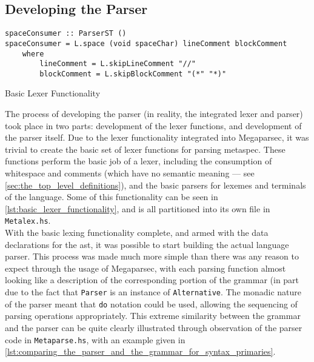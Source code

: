
\subsection{Developing the Parser} %
\label{sub:developing_the_parser}
\begin{listing}[!htb]
\begin{verbatim}
spaceConsumer :: ParserST ()
spaceConsumer = L.space (void spaceChar) lineComment blockComment
    where
        lineComment = L.skipLineComment "//"
        blockComment = L.skipBlockComment "(*" "*)"
\end{verbatim}
\caption{Basic Lexer Functionality}
\label{lst:basic_lexer_functionality}
\end{listing}

The process of developing the parser (in reality, the integrated lexer and parser) took place in two parts: development of the lexer functions, and development of the parser itself. 
Due to the lexer functionality integrated into Megaparsec, it was trivial to create the basic set of lexer functions for parsing \gls{metaspec}. 
These functions perform the basic job of a lexer, including the consumption of whitespace and comments (which have no semantic meaning --- see \autoref{sec:the_top_level_definitions}), and the basic parsers for lexemes and terminals of the language.
Some of this functionality can be seen in \autoref{lst:basic_lexer_functionality}, and is all partitioned into its own file in \texttt{Metalex.hs}.\\

With the basic lexing functionality complete, and armed with the data declarations for the \gls{ast}, it was possible to start building the actual language parser. 
This process was made much more simple than there was any reason to expect through the usage of Megaparsec, with each parsing function almost looking like a description of the corresponding portion of the grammar (in part due to the fact that \texttt{Parser} is an instance of \texttt{Alternative}. 
The monadic nature of the parser meant that \texttt{do} notation could be used, allowing the sequencing of parsing operations appropriately. 
This extreme similarity between the grammar and the parser can be quite clearly illustrated through observation of the parser code in \texttt{Metaparse.hs}, with an example given in \autoref{lst:comparing_the_parser_and_the_grammar_for_syntax_primaries}.


